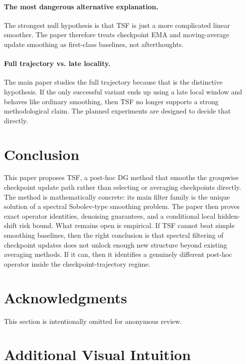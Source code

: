 \documentclass{article}
\newcommand{\tsf}{\textup{\textsc{TSF}}}
\begin{document}
\paragraph{The most dangerous alternative explanation.}
The strongest null hypothesis is that \tsf{} is just a more complicated linear smoother. The paper therefore treats checkpoint EMA and moving-average update smoothing as first-class baselines, not afterthoughts.

\paragraph{Full trajectory vs. late locality.}
The main paper studies the full trajectory because that is the distinctive hypothesis. If the only successful variant ends up using a late local window and behaves like ordinary smoothing, then \tsf{} no longer supports a strong methodological claim. The planned experiments are designed to decide that directly.

\section{Conclusion}

This paper proposes \tsf{}, a post-hoc DG method that smooths the groupwise checkpoint update path rather than selecting or averaging checkpoints directly. The method is mathematically concrete: its main filter family is the unique solution of a spectral Sobolev-type smoothing problem. The paper then proves exact operator identities, denoising guarantees, and a conditional local hidden-shift risk bound. What remains open is empirical. If \tsf{} cannot beat simple smoothing baselines, then the right conclusion is that spectral filtering of checkpoint updates does not unlock enough new structure beyond existing averaging methods. If it can, then it identifies a genuinely different post-hoc operator inside the checkpoint-trajectory regime.

\section*{Acknowledgments}

This section is intentionally omitted for anonymous review.




\appendix

\section{Additional Visual Intuition}
\end{document}
